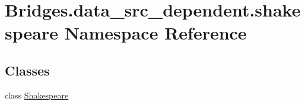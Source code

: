 \hypertarget{namespace_bridges_1_1data__src__dependent_1_1shakespeare}{}\section{Bridges.\+data\+\_\+src\+\_\+dependent.\+shakespeare Namespace Reference}
\label{namespace_bridges_1_1data__src__dependent_1_1shakespeare}
\subsection*{Classes}
\begin{DoxyCompactItemize}
\item 
class \hyperlink{class_bridges_1_1data__src__dependent_1_1shakespeare_1_1_shakespeare}{Shakespeare}
\end{DoxyCompactItemize}
